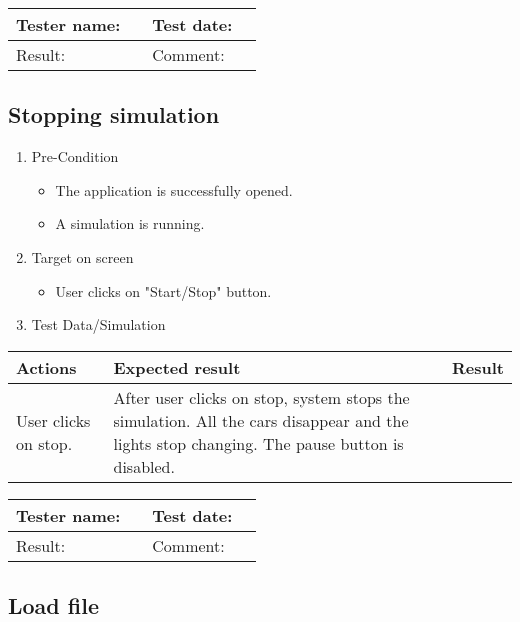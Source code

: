 \begin{tabularx}{\textwidth}{|p{3cm}X|p{3cm}X|}\hline
	Tester name: &  & Test date: & \\\hline
	Result: &  \pass & Comment: & \\\hline
\end{tabularx}

\newpage

\subsection{Stopping  simulation}

\begin{enumerate}
	\item Pre-Condition
	\begin{itemize}
		\item The application is successfully opened.
		\item A simulation is running.
	\end{itemize}
	\item Target on screen
	\begin{itemize}
		\item User clicks on "Start/Stop" button.
	\end{itemize}
	\item Test Data/Simulation
\end{enumerate}
	\begin{tabularx}{\textwidth}{|X|X|p{2.5cm}|}\hline
		Actions & Expected result & Result \\\hline
		User clicks on stop. & After user clicks on stop, system stops the simulation. All the cars disappear and the lights stop changing. The pause button is disabled. & \pass \\\hline    
	\end{tabularx}

\begin{tabularx}{\textwidth}{|p{3cm}X|p{3cm}X|}\hline
	Tester name: &  & Test date: & \\\hline
	Result: &  \pass & Comment: & \\\hline
\end{tabularx}

\newpage

\subsection{Load file}


